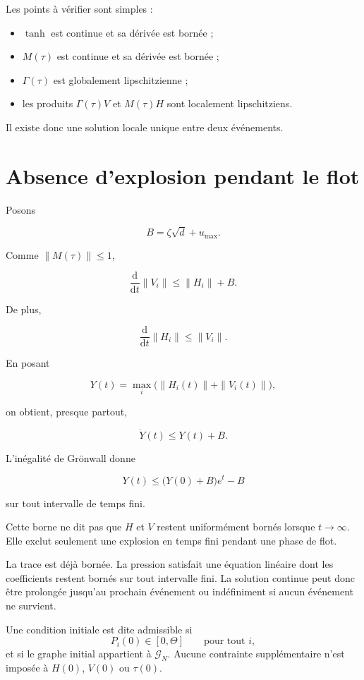 Les points à vérifier sont simples :

\begin{itemize}
\tightlist
\item
  \(\tanh\) est continue et sa dérivée est bornée ;
\item
  \(M(\tau)\) est continue et sa dérivée est bornée ;
\item
  \(\Gamma(\tau)\) est globalement lipschitzienne ;
\item
  les produits \(\Gamma(\tau)V\) et \(M(\tau)H\) sont localement lipschitziens.
\end{itemize}

Il existe donc une solution locale unique entre deux événements.

\section{Absence d'explosion pendant le flot}\label{t1-absence-dexplosion-pendant-le-flot}

Posons

\[
B=\zeta\sqrt d+u_{\max}.
\]

Comme \(\|M(\tau)\|\leq 1\),

\[
\frac{\mathrm d}{\mathrm dt}\|V_i\|
\leq
\|H_i\|+B.
\]

De plus,

\[
\frac{\mathrm d}{\mathrm dt}\|H_i\|
\leq
\|V_i\|.
\]

En posant

\[
Y(t)
=
\max_i\bigl(\|H_i(t)\|+\|V_i(t)\|\bigr),
\]

on obtient, presque partout,

\[
\dot{Y}(t)\leq Y(t)+B.
\]

L'inégalité de Grönwall donne

\[
Y(t)
\leq
\bigl(Y(0)+B\bigr)e^t-B
\]

sur tout intervalle de temps fini.

Cette borne ne dit pas que \(H\) et \(V\) restent uniformément bornés lorsque \(t\to\infty\). Elle exclut seulement une explosion en temps fini pendant une phase de flot.

La trace est déjà bornée. La pression satisfait une équation linéaire dont les coefficients restent bornés sur tout intervalle fini. La solution continue peut donc être prolongée jusqu'au prochain événement ou indéfiniment si aucun événement ne survient.

Une condition initiale est dite admissible si
\[
P_i(0)\in[0,\Theta]
\qquad\text{pour tout }i,
\]
et si le graphe initial appartient à \(\mathcal G_N\).
Aucune contrainte supplémentaire n'est imposée à
\(H(0)\), \(V(0)\) ou \(\tau(0)\).

